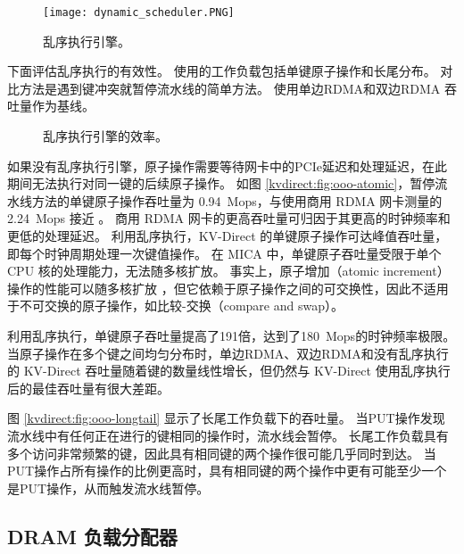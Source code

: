 \begin{figure}[htbp]
	\centering
	\texttt{[image: dynamic\_scheduler.PNG]}
	\caption{乱序执行引擎。}
	\label{kvdirect:fig:ooo-mem-access}
\end{figure}


\label{kvdirect:sec:ooo-eval}

下面评估乱序执行的有效性。
使用的工作负载包括单键原子操作和长尾分布。
对比方法是遇到键冲突就暂停流水线的简单方法。
使用单边RDMA和双边RDMA \cite {kalia2016design} 吞吐量作为基线。


\begin{figure}[htbp]
	\centering
	\caption{乱序执行引擎的效率。}
	\label{kvdirect:fig:ooo-eval}
\end{figure}

如果没有乱序执行引擎，原子操作需要等待网卡中的PCIe延迟和处理延迟，在此期间无法执行对同一键的后续原子操作。
如图 \ref{kvdirect:fig:ooo-atomic}，暂停流水线方法的单键原子操作吞吐量为 0.94~Mops，与使用商用 RDMA 网卡测量的 2.24~Mops 接近 \cite {kalia2016design}。
商用 RDMA 网卡的更高吞吐量可归因于其更高的时钟频率和更低的处理延迟。
利用乱序执行，KV-Direct 的单键原子操作可达峰值吞吐量，即每个时钟周期处理一次键值操作。
在 MICA \cite {lim2014mica} 中，单键原子吞吐量受限于单个 CPU 核的处理能力，无法随多核扩放。
事实上，原子增加（atomic increment）操作的性能可以随多核扩放 \cite {kalia2016design}，但它依赖于原子操作之间的可交换性，因此不适用于不可交换的原子操作，如比较-交换（compare and swap）。

利用乱序执行，单键原子吞吐量提高了191倍，达到了180~Mops的时钟频率极限。
当原子操作在多个键之间均匀分布时，单边RDMA、双边RDMA和没有乱序执行的 KV-Direct 吞吐量随着键的数量线性增长，但仍然与 KV-Direct 使用乱序执行后的最佳吞吐量有很大差距。

图 \ref {kvdirect:fig:ooo-longtail} 显示了长尾工作负载下的吞吐量。
当PUT操作发现流水线中有任何正在进行的键相同的操作时，流水线会暂停。
长尾工作负载具有多个访问非常频繁的键，因此具有相同键的两个操作很可能几乎同时到达。
当PUT操作占所有操作的比例更高时，具有相同键的两个操作中更有可能至少一个是PUT操作，从而触发流水线暂停。





\subsection{DRAM 负载分配器}
\label{kvdirect:sec:dram-cache}

